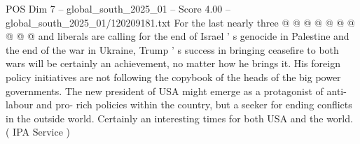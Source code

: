 \begin{textsample}{POS Dim 7 – global\_south\_2025\_01 – Score 4.00 – global\_south\_2025\_01/120209181.txt}
For the last nearly three @ @ @ @ @ @ @ @ @ @ and liberals are calling for the end of Israel ' s genocide in Palestine and the end of the war in Ukraine, Trump ' s success in bringing ceasefire to both wars will be certainly an achievement, no matter how he brings it.
His foreign policy initiatives are not following the copybook of the heads of the big power governments.
The new president of USA might emerge as a protagonist of anti-labour and pro- rich policies within the country, but a seeker for ending conflicts in the outside world.
Certainly an interesting times for both USA and the world. ( IPA Service )

\end{textsample}
